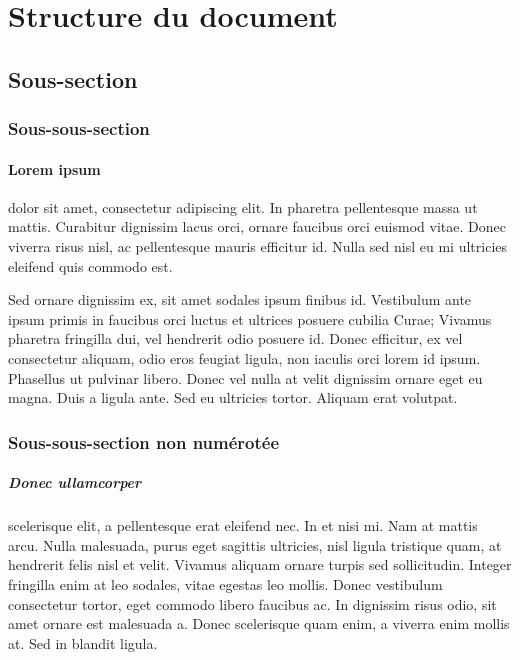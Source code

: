 \documentclass[a4paper, 11pt]{article}
\begin{document}
\setcounter{tocdepth}{1}%
\tableofcontents

\clearpage

  \section{Structure du document} \label{structure}

    \subsection{Sous-section}

      \subsubsection{Sous-sous-section}

        \paragraph{Lorem ipsum} dolor sit amet, consectetur adipiscing elit. In pharetra pellentesque massa ut mattis. Curabitur dignissim lacus orci, ornare faucibus orci euismod vitae. Donec viverra risus nisl, ac pellentesque mauris efficitur id. Nulla sed nisl eu mi ultricies eleifend quis commodo est.

        Sed ornare dignissim ex, sit amet sodales ipsum finibus id. Vestibulum ante ipsum primis in faucibus orci luctus et ultrices posuere cubilia Curae; Vivamus pharetra fringilla dui, vel hendrerit odio posuere id. Donec efficitur, ex vel consectetur aliquam, odio eros feugiat ligula, non iaculis orci lorem id ipsum. Phasellus ut pulvinar libero. Donec vel nulla at velit dignissim ornare eget eu magna. Duis a ligula ante. Sed eu ultricies tortor. Aliquam erat volutpat.

      \subsubsection*{Sous-sous-section non numérotée}

        \subparagraph{Donec ullamcorper} scelerisque elit, a pellentesque erat eleifend nec. In et nisi mi. Nam at mattis arcu. Nulla malesuada, purus eget sagittis ultricies, nisl ligula tristique quam, at hendrerit felis nisl et velit. Vivamus aliquam ornare turpis sed sollicitudin. Integer fringilla enim at leo sodales, vitae egestas leo mollis. Donec vestibulum consectetur tortor, eget commodo libero faucibus ac. In dignissim risus odio, sit amet ornare est malesuada a. Donec scelerisque quam enim, a viverra enim mollis at. Sed in blandit ligula.
\end{document}
